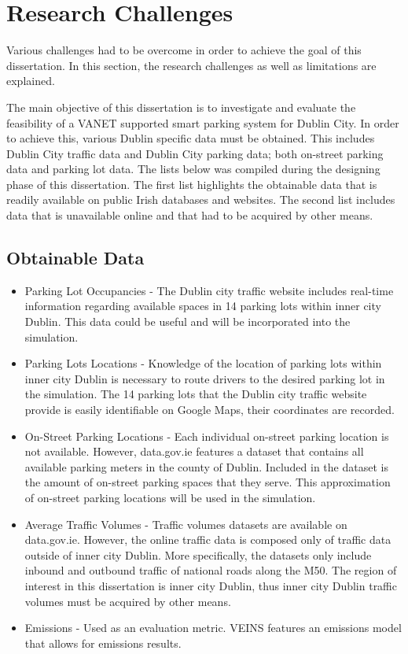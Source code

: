 \section{Research Challenges}
Various challenges had to be overcome in order to achieve the goal of this dissertation. In this section, the research challenges as well as limitations are explained.

The main objective of this dissertation is to investigate and evaluate the feasibility of a \ac{VANET} supported smart parking system for Dublin City. In order to achieve this, various Dublin specific data must be obtained. This includes Dublin City traffic data and Dublin City parking data; both on-street parking data and parking lot data. The lists below was compiled during the designing phase of this dissertation. The first list highlights the obtainable data that is readily available on public Irish databases and websites. The second list includes data that is unavailable online and that had to be acquired by other means.

\subsection*{Obtainable Data}
\begin{itemize}
    \item Parking Lot Occupancies - The Dublin city traffic website includes real-time information regarding available spaces in 14 parking lots within inner city Dublin. This data could be useful and will be incorporated into the simulation.
    \item Parking Lots Locations - Knowledge of the location of parking lots within inner city Dublin is necessary to route drivers to the desired parking lot in the simulation. The 14 parking lots that the Dublin city traffic website provide is easily identifiable on Google Maps, their coordinates are recorded.
    \item On-Street Parking Locations - Each individual on-street parking location is not available. However, data.gov.ie features a dataset that contains all available parking meters in the county of Dublin. Included in the dataset is the amount of on-street parking spaces that they serve. This approximation of on-street parking locations will be used in the simulation.
    \item Average Traffic Volumes - Traffic volumes datasets are available on data.gov.ie. However, the online traffic data is composed only of traffic data outside of inner city Dublin. More specifically, the datasets only include inbound and outbound traffic of national roads along the M50. The region of interest in this dissertation is inner city Dublin, thus inner city Dublin traffic volumes must be acquired by other means.
    \item Emissions - Used as an evaluation metric. \ac{VEINS} features an emissions model that allows for emissions results.
\end{itemize}

